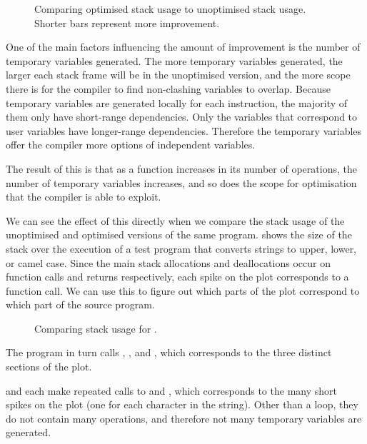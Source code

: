 \documentclass[00-main.tex]{subfiles}
\begin{document}
\begin{figure}[ht]
  \centering
  \caption{Comparing optimised stack usage to unoptimised stack usage. Shorter bars represent more improvement.}
  \label{fig:comparing stack usage optimisation across programs}
\end{figure}

One of the main factors influencing the amount of improvement is the number of temporary variables generated.
The more temporary variables generated, the larger each stack frame will be in the unoptimised version, and the more scope there is for the compiler to find non-clashing variables to overlap.
Because temporary variables are generated locally for each instruction, the majority of them only have short-range dependencies.
Only the variables that correspond to user variables have longer-range dependencies.
Therefore the temporary variables offer the compiler more options of independent variables.

The result of this is that as a function increases in its number of operations, the number of temporary variables increases, and so does the scope for optimisation that the compiler is able to exploit.

We can see the effect of this directly when we compare the stack usage of the unoptimised and optimised versions of the same program.
 shows the size of the stack over the execution of a test program that converts strings to upper, lower, or camel case.
Since the main stack allocations and deallocations occur on function calls and returns respectively, each spike on the plot corresponds to a function call. We can use this to figure out which parts of the plot correspond to which part of the source program.

\begin{figure}[ht]
  \centering
  \caption{Comparing stack usage for .}
  \label{fig:comparing stack usage for case.c}
\end{figure}

The program in turn calls , , and , which corresponds to the three distinct sections of the plot.

 and  each make repeated calls to  and , which corresponds to the many short spikes on the plot (one for each character in the string).
Other than a  loop, they do not contain many operations, and therefore not many temporary variables are generated.
\end{document}
